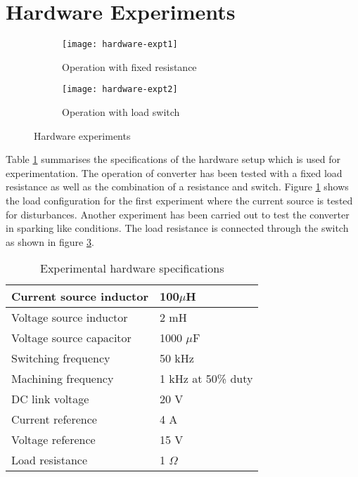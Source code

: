 \section{Hardware Experiments}
	\begin{figure}[h]
		\centering
		\begin{subfigure}{0.49\linewidth}
			\texttt{[image: hardware-expt1]}
			\caption{Operation with fixed resistance}
			\label{fig:hardware-expt1}
		\end{subfigure}
		\begin{subfigure}{0.49\linewidth}
			\texttt{[image: hardware-expt2]}
			\caption{Operation with load switch}
			\label{fig:hardware-expt2}
		\end{subfigure}
		\caption{Hardware experiments}
	\end{figure}
	Table \ref{tab:hardware-param} summarises the specifications of the hardware setup which is used for experimentation. The operation of converter has been tested with a fixed load resistance as well as the combination of a resistance and switch. Figure \ref{fig:hardware-expt1} shows the load configuration for the first experiment where the current source is tested for disturbances. Another experiment has been carried out to test the converter in sparking like conditions. The load resistance is connected through the switch as shown in figure \ref{fig:hardware-expt2}.
	\begin{table}[h]
		\centering
			\begin{tabular}{|l|l|} \hline
				Current source inductor & 100$\mu$H \\ \hline
				Voltage source inductor & 2 mH \\ \hline
				Voltage source capacitor & 1000 $\mu$F \\ \hline
				Switching frequency & 50 kHz \\ \hline
				Machining frequency & 1 kHz at 50\% duty \\ \hline
				DC link voltage & 20 V \\ \hline
				Current reference & 4 A \\ \hline
				Voltage reference & 15 V \\ \hline
				Load resistance & 1 $\Omega$ \\ \hline
			\end{tabular}
		\caption{Experimental hardware specifications}
		\label{tab:hardware-param}
	\end{table}
	
